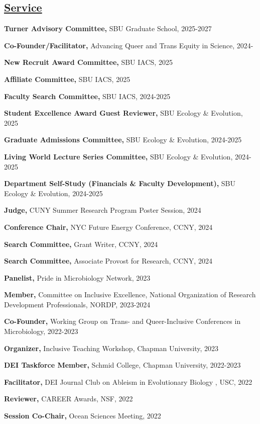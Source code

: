 \documentclass[]{res}
\begin{document}
\begin{resume}
\section{\underline{Service}} \vspace{2mm}

{\bf Turner Advisory Committee,} SBU Graduate School, 2025-2027

{\bf Co-Founder/Facilitator,} Advancing Queer and Trans Equity in Science, 2024-

{\bf New Recruit Award Committee,} SBU IACS, 2025

{\bf Affiliate Committee,} SBU IACS, 2025

{\bf Faculty Search Committee,} SBU IACS, 2024-2025

{\bf Student Excellence Award Guest Reviewer,} SBU Ecology \& Evolution, 2025

{\bf Graduate Admissions Committee,} SBU Ecology \& Evolution, 2024-2025

{\bf Living World Lecture Series Committee,} SBU Ecology \& Evolution, 2024-2025

{\bf Department Self-Study (Financials \& Faculty Development),} SBU Ecology \& Evolution, 2024-2025

{\bf Judge,} CUNY Summer Research Program Poster Session, 2024

{\bf Conference Chair,} NYC Future Energy Conference, CCNY, 2024

{\bf Search Committee,} Grant Writer, CCNY, 2024

{\bf Search Committee,} Associate Provost for Research, CCNY, 2024

{\bf Panelist,} Pride in Microbiology Network, 2023

{\bf Member,} Committee on Inclusive Excellence, National Organization of Research Development Professionals, NORDP, 2023-2024

{\bf Co-Founder,} Working Group on Trans- and Queer-Inclusive Conferences in Microbiology, 2022-2023

{\bf Organizer,} {Inclusive Teaching Workshop}, Chapman University, 2023

{\bf DEI Taskforce Member,} {Schmid College}, Chapman University, 2022-2023

{\bf Facilitator,} DEI Journal Club on Ableism in Evolutionary Biology , USC, 2022

{\bf Reviewer,} CAREER Awards, NSF, 2022

{\bf Session Co-Chair,} {Ocean Sciences Meeting}, 2022


\end{resume}
\end{document}
